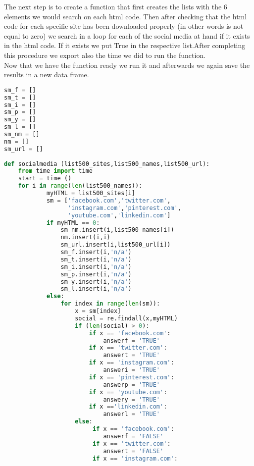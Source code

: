 \documentclass{article}
\begin{document}
The next step is to create a function that first creates the lists with the 6 elements we would search on each html code. Then after checking that the html code for each specific site has been downloaded properly (in other words is not equal to zero) we search in a loop for each of the social media at hand if it exists in the html code. If it exists we put True in the respective list.After completing this procedure we export also the time we did to run the function.\\
Now that we have the function ready we run it and afterwards we again save the results in a new data frame.
\begin{lstlisting}[language=Python]
sm_f = []
sm_t = []
sm_i = []
sm_p = []
sm_y = []
sm_l = []   
sm_nm = [] 
nm = []
sm_url = []
 
def socialmedia (list500_sites,list500_names,list500_url):
    from time import time 
    start = time ()
    for i in range(len(list500_names)):        
            myHTML = list500_sites[i]
            sm = ['facebook.com','twitter.com',
                  'instagram.com','pinterest.com',
                  'youtube.com','linkedin.com'] 
            if myHTML == 0:
                sm_nm.insert(i,list500_names[i]) 
                nm.insert(i,i)
                sm_url.insert(i,list500_url[i])
                sm_f.insert(i,'n/a')
                sm_t.insert(i,'n/a')
                sm_i.insert(i,'n/a')
                sm_p.insert(i,'n/a')
                sm_y.insert(i,'n/a')
                sm_l.insert(i,'n/a')
            else:
                for index in range(len(sm)):
                    x = sm[index]
                    social = re.findall(x,myHTML)                                
                    if (len(social) > 0):
                        if x == 'facebook.com':
                            answerf = 'TRUE'
                        if x == 'twitter.com':
                            answert = 'TRUE'
                        if x == 'instagram.com':
                            answeri = 'TRUE'
                        if x == 'pinterest.com':
                            answerp = 'TRUE'
                        if x == 'youtube.com':
                            answery = 'TRUE'
                        if x =='linkedin.com':
                            answerl = 'TRUE'                   
                    else:
                         if x == 'facebook.com':
                            answerf = 'FALSE'
                         if x == 'twitter.com':
                            answert = 'FALSE'
                         if x == 'instagram.com':

\end{lstlisting}
\end{document}
